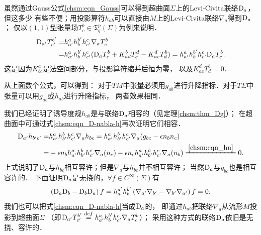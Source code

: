 虽然通过Gauss公式\eqref{chsm:eqn_Gauss}可以得到超曲面$\Sigma$上的Levi-Civita联络${\rm D}_a$，但这多少
有些不便；用投影算符$h_{ab}$可以直接由$M$上的Levi-Civita联络${\nabla}_{a}$得到${\rm D}_a$；
仅以$(1,1)$型张量场$T^b_c \in \mathfrak{T}^p_q(\Sigma)$为例来说明．
\begin{equation}\label{chsm:eqn_D-nabla-h}
    \begin{aligned}
    {\rm D}_{a'} {T}^{b'}_{c'} =& h_{a'}^a h^{b'}_b h_{c'}^c {\nabla}_{a} T^b_c \\
    =& h_{a'}^a h^{b'}_b h_{c'}^c ({\rm D}_{a} T^b_c  + K^b_{ad} T^d_c - K^d_{ac} T^b_d)
    =  h_{a'}^a h^{b'}_b h_{c'}^c {\rm D}_{a} {T}^b_c .
    \end{aligned}
\end{equation}
这是因为$K^a_{bc}$是法空间部分，与投影算符缩并后恒为零，
以及$K^d_{ac} T^b_d=0$．

从上面数个公式，可以得到：
对于$TM$中张量必须用$g_{ab}$进行升降指标．对于$T\Sigma$中张量可以用$g_{ab}$或$h_{ab}$进行升降指标，
两者效果相同．


我们已经证明了诱导度规$h_{ab}$是与联络${\rm D}_a$相容的（见定理\ref{chsm:thm_Dg}）；
在超曲面中可通过式\eqref{chsm:eqn_D-nabla-h}再次证明它们相容．
\begin{align}
    {\rm D}_{a'} h_{b'c'} =& h_{a'}^a h_{b'}^b h_{c'}^c {\nabla}_{a} h_{bc}
    =  h_{a'}^a h_{b'}^b h_{c'}^c {\nabla}_{a} (g_{bc}- \epsilon {n}_b {n}_c) \notag \\
    =& - \epsilon {n}_b h_{a'}^a h_{b'}^b h_{c'}^c {\nabla}_{a} ( {n}_c)
       - \epsilon {n}_c h_{a'}^a h_{b'}^b h_{c'}^c {\nabla}_{a} ( {n}_b )
    \xlongequal{\ref{chsm:eqn_hn}}0 .
\end{align}
上式说明了${\rm D}_{a}$与$h_{bc}$相互容许；但是$\nabla_{a}$与$h_{bc}$并不相互容许；
当然${\rm D}_{a}$与$g_{bc}$也是相互容许的．
下面证明${\rm D}_{a}$是无挠的，$\forall f\in C^\infty(\Sigma)$有
\begin{equation}
    \left({\rm D}_{a}{\rm D}_{b}-{\rm D}_{b}{\rm D}_{a}\right) f
    =h^{a'}_a h^{b'}_b \left(\nabla_{a'}\nabla_{b'}-\nabla_{b'}\nabla_{a'}\right) f =0 .
\end{equation}
我们也可以把式\eqref{chsm:eqn_D-nabla-h}当成${\rm D}_{a}$的，
即通过$h_{ab}$把联络$\nabla_a$从流形$M$投影到超曲面$\Sigma$
（即${\rm D}_{a'} T^{b'}_{c'} \overset{def}{=} h_{a'}^a h^{b'}_b h_{c'}^c {\nabla}_{a} T^b_c$）；
采用这种方式的联络${\rm D}_a$依旧是无挠、容许的．



